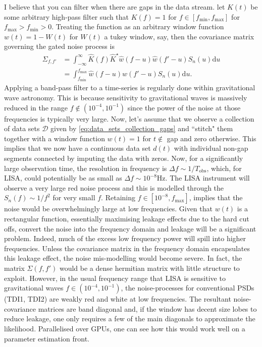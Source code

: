 \documentclass{article}
\begin{document}
I believe that you can filter when there are gaps in the data stream. let $K(t)$ be some arbitrary high-pass filter such that $K(f) = 1$ for $f \in  [f_{\text{min}}, f_{\text{max}}]$ for $f_{\text{max}} > f_{\text{min}} > 0$. Treating the function as an arbitrary window function $w(t) = 1 - W(t)$ for $W(t)$ a tukey window, say, then the covariance matrix governing the gated noise process is
\begin{align}
\Sigma_{f,f'} &= \int_{-\infty}^{\infty} \hat{K}(f)\hat{K}^{\star}\hat{w}(f - u)\hat{w}(f' - u)S_{n}(u)\text{d}u \\
& = \int_{f_{\text{min}}}^{f_{\text{max}}} \hat{w}(f - u)\hat{w}(f' - u)S_{n}(u)\text{d}u.
\end{align}
Applying a band-pass filter to a time-series is regularly done within gravitational wave astronomy. This is because sensitivity to gravitational waves is massively reduced in the range $f \not \in (10^{-4}, 10^{-1})$ since the power of the noise at those frequencies is typically very large. Now, let's assume that we observe a collection of data sets $\mathcal{D}$ given by \eqref{eq:data_sets_collection_gaps} and ``stitch" them together with a window function $w(t) = 1$ for $t \not \in$ gap and zero otherwise. This implies that we now have a continuous data set $d(t)$ with individual non-gap segments connected by imputing the data with zeros. Now, for a significantly large observation time, the resolution in frequency is $\Delta f \sim 1/T_{\text{obs}}$, which, for LISA, could potentially be as small as $\Delta f \sim 10^{-8}$Hz. The LISA instrument will observe a very large red noise process and this is modelled through the $S_{n}(f) \sim 1/f^2$ for very small $f$. Retaining $f \in [10^{-8}, f_{\text{max}}]$, implies that the noise would be overwhelmingly large at low frequencies. Given that $w(t)$ is a rectangular function, essentially maximising leakage effects due to the hard cut offs, convert the noise into the frequency domain and leakage will be a significant problem. Indeed, much of the excess low frequency power will spill into higher frequencies. Unless the covariance matrix in the frequency domain encapsulates this leakage effect, the noise mis-modelling would become severe. In fact, the matrix $\Sigma(f,f')$ would be a dense hermitian matrix with little structure to exploit. However, in the usual frequency range that LISA is sensitive to gravitational waves $f \in (10^{-4}, 10^{-1})$, the noise-processes for conventional PSDs (TDI1, TDI2) are weakly red and white at low frequencies. The resultant noise-covariance matrices are band diagonal and, if the window has decent size lobes to reduce leakage, one only requires a few of the main diagonals to approximate the likelihood. Parallelised over GPUs, one can see how this would work well on a parameter estimation front. 
\end{document}
